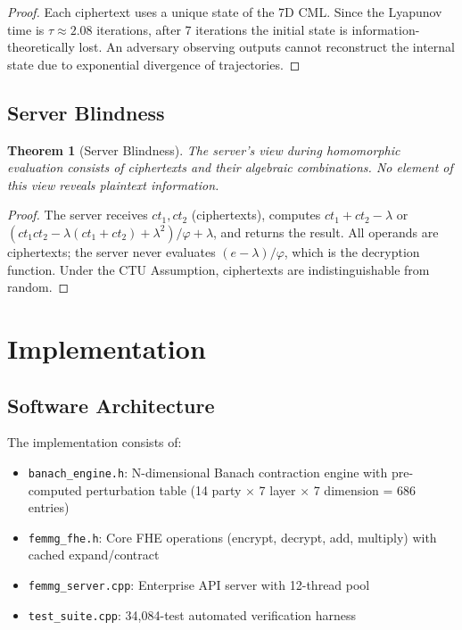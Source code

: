 \documentclass[11pt,a4paper]{article}
\newtheorem{theorem}{Theorem}[section]
\begin{document}
\begin{proof}
Each ciphertext uses a unique state of the 7D CML. Since the Lyapunov time is $\tau \approx 2.08$ iterations, after 7 iterations the initial state is information-theoretically lost. An adversary observing outputs cannot reconstruct the internal state due to exponential divergence of trajectories.
\end{proof}

\subsection{Server Blindness}

\begin{theorem}[Server Blindness]
The server's view during homomorphic evaluation consists of ciphertexts and their algebraic combinations. No element of this view reveals plaintext information.
\end{theorem}

\begin{proof}
The server receives $ct_1, ct_2$ (ciphertexts), computes $ct_1 + ct_2 - \lambda$ or $(ct_1 ct_2 - \lambda(ct_1 + ct_2) + \lambda^2)/\varphi + \lambda$, and returns the result. All operands are ciphertexts; the server never evaluates $(e - \lambda)/\varphi$, which is the decryption function. Under the CTU Assumption, ciphertexts are indistinguishable from random.
\end{proof}

\section{Implementation}
\label{sec:impl}

\subsection{Software Architecture}

The implementation consists of:
\begin{itemize}
    \item \texttt{banach\_engine.h}: N-dimensional Banach contraction engine with pre-computed perturbation table (14 party $\times$ 7 layer $\times$ 7 dimension = 686 entries)
    \item \texttt{femmg\_fhe.h}: Core FHE operations (encrypt, decrypt, add, multiply) with cached expand/contract
    \item \texttt{femmg\_server.cpp}: Enterprise API server with 12-thread pool
    \item \texttt{test\_suite.cpp}: 34,084-test automated verification harness
\end{itemize}
\end{document}
